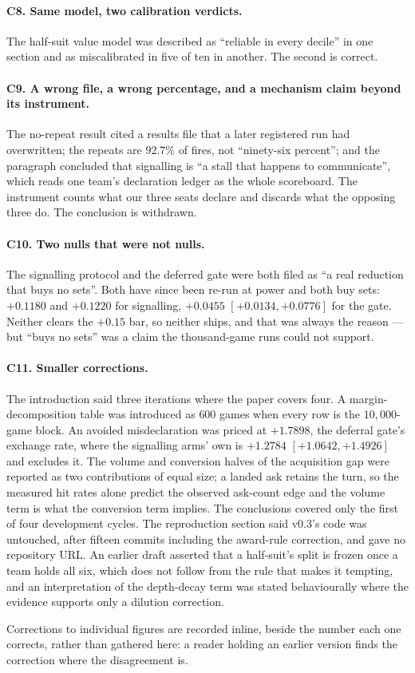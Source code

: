 \paragraph{C8. Same model, two calibration verdicts.} The half-suit value model
was described as ``reliable in every decile'' in one section and as
miscalibrated in five of ten in another. The second is correct.

\paragraph{C9. A wrong file, a wrong percentage, and a mechanism claim beyond
its instrument.} The no-repeat result cited a results file that a later
registered run had overwritten; the repeats are $92.7\%$ of fires, not
``ninety-six percent''; and the paragraph concluded that signalling is ``a
stall that happens to communicate'', which reads one team's declaration ledger
as the whole scoreboard. The instrument counts what our three seats declare and
discards what the opposing three do. The conclusion is withdrawn.

\paragraph{C10. Two nulls that were not nulls.} The signalling protocol and the
deferred gate were both filed as ``a real reduction that buys no sets''. Both
have since been re-run at power and both buy sets: $+0.1180$ and $+0.1220$ for
signalling, $+0.0455$ $[+0.0134, +0.0776]$ for the gate. Neither clears the
$+0.15$ bar, so neither ships, and that was always the reason --- but ``buys no
sets'' was a claim the thousand-game runs could not support.

\paragraph{C11. Smaller corrections.} The introduction said three iterations
where the paper covers four. A margin-decomposition table was introduced as
$600$ games when every row is the $10{,}000$-game block. An avoided
misdeclaration was priced at $+1.7898$, the deferral gate's exchange rate,
where the signalling arms' own is $+1.2784$ $[+1.0642, +1.4926]$ and excludes
it. The volume and conversion halves of the acquisition gap were reported as
two contributions of equal size; a landed ask retains the turn, so the measured
hit rates alone predict the observed ask-count edge and the volume term is what
the conversion term implies. The conclusions covered only the first of four
development cycles. The reproduction section said v0.3's code was untouched,
after fifteen commits including the award-rule correction, and gave no
repository URL. An earlier draft asserted that a half-suit's split is
frozen once a team holds all six, which does not follow from the rule
that makes it tempting, and an interpretation of the depth-decay term
was stated behaviourally where the evidence supports only a dilution
correction.

Corrections to individual figures are recorded inline, beside the
number each one corrects, rather than gathered here: a reader holding
an earlier version finds the correction where the disagreement is.
